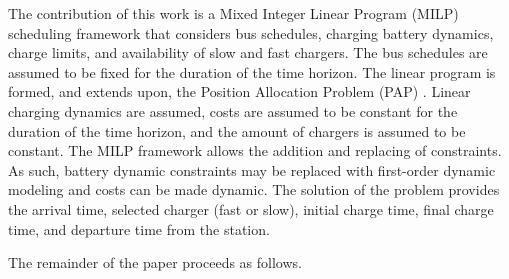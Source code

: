 \documentclass[letterpaper, 10pt, conference]{IEEEtran}
\begin{document}
The contribution of this work is a Mixed Integer Linear Program (MILP) scheduling framework that considers bus schedules, charging battery dynamics, charge limits, and availability of slow and fast chargers. The bus schedules are assumed to be fixed for the duration of the time horizon. The linear program is formed, and extends upon, the Position Allocation Problem (PAP) \cite{Qarebagh2019}. Linear charging dynamics are assumed, costs are assumed to be constant for the duration of the time horizon, and the amount of chargers is assumed to be constant. The MILP framework allows the addition and replacing of constraints. As such, battery dynamic constraints may be replaced with first-order dynamic modeling and costs can be made dynamic. The solution of the problem provides the arrival time, selected charger (fast or slow), initial charge time, final charge time, and departure time from the station.

The remainder of the paper proceeds as follows.
\end{document}
